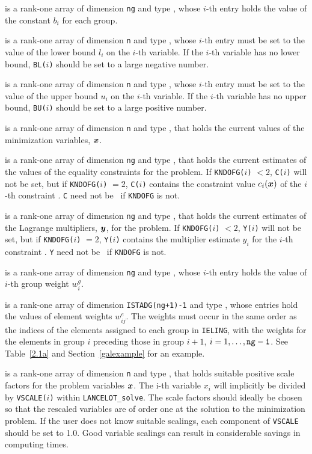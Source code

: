 \documentclass{galahad}
\newcommand{\fullpackagename}{LANC\-E\-LOT}
\newcommand{\solver}{{\tt \fullpackagename\_solve}}
\begin{document}
\begin{description}
 is a rank-one array of dimension {\tt ng} and type
\realdp, whose $i$-th entry holds the value of the constant
$b_i$ for each group.

 is a rank-one array of dimension {\tt n} and type
\realdp, whose $i$-th entry must be set
to the value of the lower bound $l_i$ on the $i$-th variable.
If the $i$-th variable has no lower bound, {\tt BL($i$)} should be set to
a large negative number.

 is a rank-one array of dimension {\tt n} and type
\realdp, whose $i$-th
entry must be set
to the value of the upper bound $u_i$ on the $i$-th variable.
If the $i$-th variable has no upper bound, {\tt BU($i$)} should be set to
a large positive number.

 is a rank-one array of dimension {\tt n} and type
\realdp, that holds the current values of the
minimization variables, ${\bm{x}}$.

 is a rank-one array of dimension {\tt ng} and type
\realdp, that holds the current estimates of the values of the
equality constraints
for the problem.
If {\tt KNDOFG($i$)} $<2$, {\tt C($i$)}
will not be set, but if {\tt KNDOFG($i$)} $= 2$, {\tt C($i$)} contains
the constraint value $c_i({\bm{x}})$
of the $i$-th constraint .
{\tt C} need not be \associated\ if {\tt KNDOFG} is not.

 is a rank-one array of dimension {\tt ng} and type
\realdp, that holds the current estimates of the Lagrange multipliers,
${\bm{y}}$, for the problem. If {\tt KNDOFG($i$)} $<2$, {\tt Y($i$)}
will not be set, but if {\tt KNDOFG($i$)} $= 2$, {\tt Y($i$)} contains
the multiplier estimate $y_i$
for the $i$-th constraint .
{\tt Y} need not be \associated\ if {\tt KNDOFG} is not.

 is a rank-one array of dimension {\tt ng} and type
\realdp, whose $i$-th entry holds
the value of $i$-th group weight $w^g_i$.

 is a rank-one array of dimension {\tt ISTADG(ng+1)-1} and type
\realdp, whose entries hold the values of element weights
$w^e_{ij}$. The weights must occur in the same order as the indices of the
elements assigned to each group
in {\tt IELING}, with the weights for the elements
in group $i$ preceding those in group $i+1$, $i=1, \ldots, {\tt ng-1}$.
See Table~\ref{2.1a} and Section~\ref{galexample} for an example.

 is a rank-one array of dimension {\tt n} and type
\realdp, that holds suitable positive scale
factors for the problem variables ${\bm{x}}$.
The {i}-th variable $x_i$ will implicitly be divided by
{\tt VSCALE($i$)} within \solver. The scale factors should ideally
be chosen so that the rescaled variables are of order one at the
solution to the minimization problem. If the user does not know
suitable scalings, each component of {\tt VSCALE} should be set to 1.0.
Good variable scalings can result in considerable savings in
computing times.


\end{description}
\end{document}
